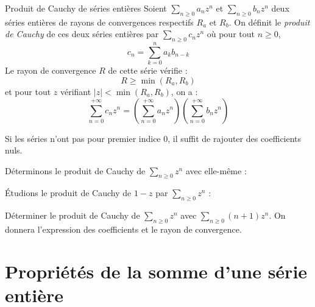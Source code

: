 \documentclass[french,11pt,twoside]{VcCours}
\begin{document}
\begin{Theoreme}{Produit de Cauchy de séries entières}
Soient $\sum_{n \geq 0} a_n z^n$ et $\sum_{n \geq 0} b_n z^n$ deux séries entières de rayons de convergences respectifs $R_a$ et $R_b$. On définit le \emph{produit de Cauchy} de ces deux séries entières par $\sum_{n \geq 0} c_n z^n$ où pour tout $n \geq 0$,
$$ c_n =  \sum_{k=0}^n a_k b_{n-k}  $$
Le rayon de convergence $R$ de cette série vérifie :
$$ R \geq \min(R_a,R_b)$$
et pour tout $z$ vérifiant $\vert z \vert < \min(R_a,R_b)$, on a :
$$ \sum_{n=0}^{+ \infty} c_n z^n = \left( \sum _{n=0}^{+ \infty} a_n z^n \right)  \left( \sum _{n=0}^{+ \infty} b_n z^n \right)$$
\end{Theoreme}

\begin{Remarque}{} Si les séries n'ont pas pour premier indice $0$, il suffit de rajouter des coefficients nuls.
\end{Remarque}

\begin{Demonstration}{}

    \vspace*{ 4cm}
\end{Demonstration}
\newpage

\begin{Exemple}{} Déterminons le produit de Cauchy de $\sum_{n \geq 0} z^n$ avec elle-même :


\vspace*{5cm}
\end{Exemple}


\begin{Exemple}{} Étudions le produit de Cauchy de $1-z$ par $\sum_{n \geq 0} z^n$ :

\vspace*{6.5cm}
\end{Exemple}



\begin{ApplicationDirecte}{} Déterminer le produit de Cauchy de $\sum_{n \geq 0} z^n$ avec $\sum_{n \geq 0} (n+1)z^n$. On donnera l'expression des coefficients et le rayon de convergence.
\end{ApplicationDirecte}

\section{Propriétés de la somme d'une série entière}
\end{document}
